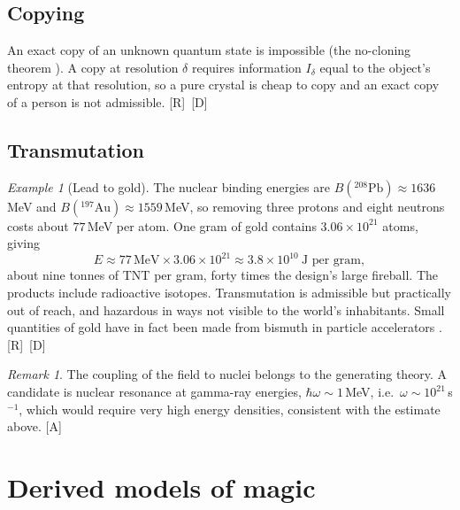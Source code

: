 \documentclass[11pt,a4paper]{article}
\numberwithin{equation}{section}
\theoremstyle{definition}
\theoremstyle{plain}
\theoremstyle{remark}
\newtheorem{remark}[definition]{Remark}
\newtheorem{example}[definition]{Example}
\newcommand{\tagD}{\textcolor{tag}{\textsf{[D]}}}
\newcommand{\tagR}{\textcolor{tag}{\textsf{[R]}}}
\newcommand{\tagA}{\textcolor{tag}{\textsf{[A]}}}
\begin{document}
\subsection{Copying}
An exact copy of an unknown quantum state is impossible (the no-cloning theorem \cite{wootters}). A copy at resolution $\delta$ requires information $I_\delta$ equal to the object's entropy at that resolution, so a pure crystal is cheap to copy and an exact copy of a person is not admissible. \tagR\ \tagD

\subsection{Transmutation}
\begin{example}[Lead to gold]
The nuclear binding energies are $B(^{208}\mathrm{Pb})\approx1636$\,MeV and $B(^{197}\mathrm{Au})\approx1559$\,MeV, so removing three protons and eight neutrons costs about $77$\,MeV per atom. One gram of gold contains $3.06\times10^{21}$ atoms, giving
\begin{equation}
E\approx 77\,\text{MeV}\times3.06\times10^{21}\approx3.8\times10^{10}\ \text{J per gram},
\end{equation}
about nine tonnes of TNT per gram, forty times the design's large fireball. The products include radioactive isotopes. Transmutation is admissible but practically out of reach, and hazardous in ways not visible to the world's inhabitants. Small quantities of gold have in fact been made from bismuth in particle accelerators \cite{aleklett}. \tagR\ \tagD
\end{example}
\begin{remark}
The coupling of the field to nuclei belongs to the generating theory. A candidate is nuclear resonance at gamma-ray energies, $\hbar\omega\sim1$\,MeV, i.e.\ $\omega\sim10^{21}$\,s$^{-1}$, which would require very high energy densities, consistent with the estimate above. \tagA
\end{remark}

\section{Derived models of magic}\label{sec:stack}
\end{document}
